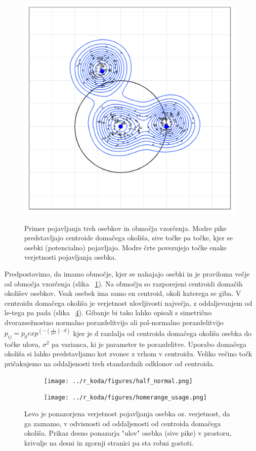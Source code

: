 \begin{figure}[htb]
 \begin{center}
 \scalebox{1.2} %
 {\includegraphics*[width=0.5\linewidth]{../r_koda_slike/figures/kernels_hr.png}}
 \end{center}
 \caption[Vzorčene točke in območje vzorčenja]{Primer pojavljanja treh osebkov in območja vzorčenja. Modre pike predstavljajo centroide domačega okoliša, sive točke pa točke, kjer se osebki (potencialno) pojavljajo. Modre črte povezujejo točke enake verjetnosti pojavljanja osebka.}
 \label{sli:slika1}
\end{figure}

Predpostavimo, da imamo območje, kjer se nahajajo osebki in je praviloma večje od območja vzorčenja (slika ~\ref{sli:slika1}). Na območju so razporejeni centroidi domačih okolišev osebkov. Vsak osebek ima samo en centroid, okoli katerega se giba. V centroidu domačega okoliša je verjetnost ulovljivosti največja, z oddaljevanjem od le-tega pa pada (slika ~\ref{sli:slika2}). Gibanje bi tako lahko opisali s simetrično dvorazsežnostno normalno porazdelitvijo ali pol-normalno porazdelitvijo $p_{ij} = p_0 exp^{(-(\frac{1}{2 \sigma^2}) \cdot d)}$ \citep[stran~127]{royle_spatial_2013} kjer je d razdalja od centroida domačega okoliša osebka do točke ulova, $\sigma^2$ pa varianca, ki je parameter te porazdelitve. Uporabo domačega okoliša si lahko predstavljamo kot zvonec z vrhom v centroidu. Veliko večino točk pričakujemo na oddaljenosti treh standardnih odklonov od centroida.

\begin{figure}
\centering
\begin{subfigure}{0.5\textwidth}
  \centering
  \texttt{[image: ../r\_koda/figures/half\_normal.png]}
  \label{sli:sub2.1}
\end{subfigure}%
\begin{subfigure}{0.5\textwidth}
  \centering
  \texttt{[image: ../r\_koda/figures/homerange\_usage.png]}
  \label{sli:sub2.2}
\end{subfigure}
\caption[Funkcija simuliranja vzorčnih točk]{Levo je ponazorjena verjetnost pojavljanja osebka oz. verjetnost, da ga zaznamo, v odvisnosti od oddaljenosti od centroida domačega okoliša. Prikaz desno ponazarja "ulov" osebka (sive pike) v prostoru, krivulje na desni in zgornji stranici pa sta robni gostoti.}
\label{sli:slika2}
\end{figure}

